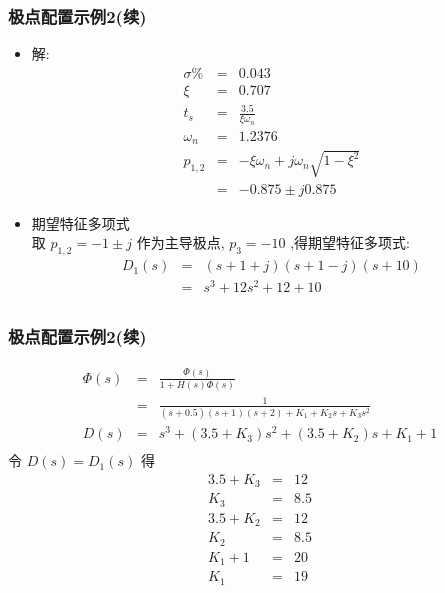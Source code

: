 \documentclass{article}
\begin{document}
\begin{frame}
\frametitle{极点配置示例2(续)}
\label{sec-4-2-5}
\begin{itemize}

\item 解:
\label{sec-4-2-5-1}%
\begin{eqnarray*}
\sigma\% & = & 0.043\\
\xi &=& 0.707 \\
t_s &=& \frac{3.5}{\xi\omega_n} \\
\omega_n &=& 1.2376 \\
p_{1,2} &=& -\xi\omega_n+j\omega_n\sqrt{1-\xi^2} \\
 &=& -0.875\pm j0.875 
\end{eqnarray*}


\item 期望特征多项式\\
\label{sec-4-2-5-2}%
取  $p_{1,2}=-1\pm j$ 作为主导极点,  $p_3=-10$ ,得期望特征多项式: 
\begin{eqnarray*}
D_1(s)&=&(s+1+j)(s+1-j)(s+10)\\
&=&s^3+12s^2+12+10 \\
\end{eqnarray*}

\end{itemize} %
\end{frame}
\begin{frame}
\frametitle{极点配置示例2(续)}
\label{sec-4-2-6}


\begin{eqnarray*}
\Phi(s) &=& \frac{\Phi(s)}{1+H(s)\Phi(s)} \\
&=& \frac{1}{(s+0.5)(s+1)(s+2)+K_1+K_2 s+K_3 s^2 }\\
D(s) &=& s^3+(3.5+K_3)s^2+(3.5+K_2)s+K_1+1 \\
\end{eqnarray*}
令  $D(s)= D_1(s)$  得
\begin{eqnarray*}
3.5+K_3 &=& 12 \\
K_3 &=& 8.5 \\
3.5+K_2 &=& 12 \\
K_2 &=& 8.5 \\
K_1+1 &=& 20 \\
K_1 &=& 19
\end{eqnarray*}
\end{frame}
\end{document}
